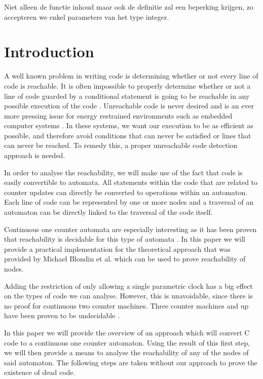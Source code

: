 \documentclass[12pt]{article}
\begin{document}
Niet alleen de functie inhoud maar ook de definitie zal een beperking krijgen, zo accepteren we enkel parameters van het type integer.
\newpage
\section{Introduction}
A well known problem in writing code is determining whether or not every line of code is reachable. It is often impossible to properly determine whether or not a line of code guarded by a conditional statement is going to be reachable in any possible execution of the code \cite{713323, 10.1145/1292316.1292319}. Unreachable code is never desired and is an ever more pressing issue for energy restrained environments such as embedded computer systems \cite{embeddedefficiency}. In these systems, we want our execution to be as efficient as possible, and therefore avoid conditions that can never be satisfied or lines that can never be reached. To remedy this, a proper unreachable code detection approach is needed.

In order to analyse the reachability, we will make use of the fact that code is easily convertible to automata. All statements within the code that are related to counter updates can directly be converted to operations within an automaton. Each line of code can be represented by one or more nodes and a traversal of an automaton can be directly linked to the traversal of the code itself.

Continuous one counter automata are especially interesting as it has been proven that reachability is decidable for this type of automata \cite{succintandparametriconecounter, danialandjoel, blondin2021continuous}. In this paper we will provide a practical implementation for the theoretical approach that was provided by Michael Blondin et al.\cite{blondin2021continuous} which can be used to prove reachability of nodes. 

Adding the restriction of only allowing a single parametric clock has a big effect on the types of code we can analyse. However, this is unavoidable, since there is no proof for continuous two counter machines. Three counter machines and up have been proven to be undecidable \cite{FEARNLEY201526}.

In this paper we will provide the overview of an approach which will convert C code to a continuous one counter automaton. Using the result of this first step, we will then provide a means to analyse the reachability of any of the nodes of said automaton. The following steps are taken without our approach to prove the existence of dead code.
\end{document}
